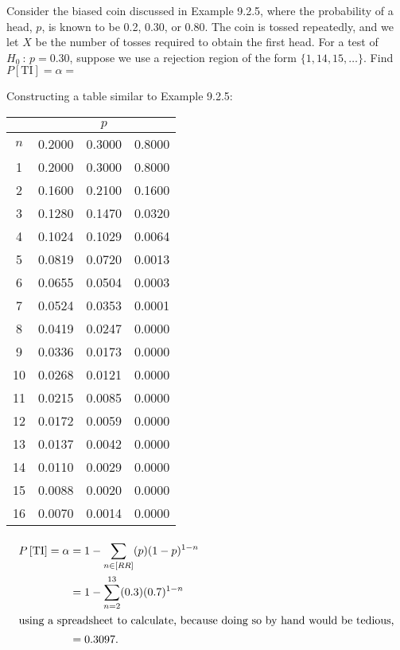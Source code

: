 \documentclass[answers]{exam}
\begin{document}
\begin{questions}
\question 
Consider the biased coin discussed in Example 9.2.5, where the probability of a head, 
\(p\), is known to be 0.2, 0.30, or 0.80. 
The coin is tossed repeatedly, 
and we let \(X\) be the number of tosses required to obtain the first head. 
For a test of \(H_0\ :\,p=0.30\), suppose we use a rejection region of the form
\(\{1,14,15,\ldots\}\). Find \(P\left[\text{TI}\right]=\alpha=\)
\begin{solution}
	Constructing a table similar to Example 9.2.5: \\
	\begin{center}
		\begin{tabular}{c|rrr}
			& \multicolumn{3}{c}{\(p\)} \\ \toprule
			\(n\) & 0.2000 & 0.3000 &  0.8000 \\ \midrule
			1   & 0.2000 & 0.3000 &  0.8000 \\
			2   & 0.1600 & 0.2100 &  0.1600 \\
			3   & 0.1280 & 0.1470 &  0.0320 \\
			4   & 0.1024 & 0.1029 &  0.0064 \\
			5   & 0.0819 & 0.0720 &  0.0013 \\
			6   & 0.0655 & 0.0504 &  0.0003 \\
			7   & 0.0524 & 0.0353 &  0.0001 \\
			8   & 0.0419 & 0.0247 &  0.0000 \\
			9   & 0.0336 & 0.0173 &  0.0000 \\
			10   & 0.0268 & 0.0121 &  0.0000 \\
			11   & 0.0215 & 0.0085 &  0.0000 \\
			12   & 0.0172 & 0.0059 &  0.0000 \\
			13   & 0.0137 & 0.0042 &  0.0000 \\
			14   & 0.0110 & 0.0029 &  0.0000 \\
			15   & 0.0088 & 0.0020 &  0.0000 \\
			16   & 0.0070 & 0.0014 &  0.0000 \\ \bottomrule
			\end{tabular}
	\end{center}

	\begin{align*}
		P\left[\text{TI}\right]=\alpha&=1-\sum_{n\in[RR]}^{}(p)(1-p)^{1-n} \\
		&=1-\sum_{n=2}^{13}(0.3)(0.7)^{1-n} \\
		\intertext{using a spreadsheet to calculate, because doing so by hand would be tedious,}
		&= 0.3097.
	\end{align*}
\end{solution}


\end{questions}
\end{document}
